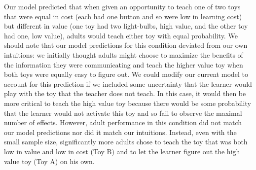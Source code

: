 \documentclass[10pt,letterpaper]{article}
\begin{document}
Our model predicted that when given an opportunity to teach one of two toys that were equal in cost (each had one button and so were low in learning cost) but different in value (one toy had two light-bulbs, high value, and the other toy had one, low value), adults would teach either toy with equal probability. We should note that our model predictions for this condition deviated from our own intuitions: we initially thought adults might choose to maximize the benefits of the information they were communicating and teach the higher value toy when both toys were equally easy to figure out. We could modify our current model to account for this prediction if we included some uncertainty that the learner would play with the toy that the teacher does not teach. In this case, it would then be more critical to teach the high value toy because there would be some probability that the learner would not activate this toy and so fail to observe the maximal number of effects. However, adult performance in this condition did not match our model predictions nor did it match our intuitions. Instead, even with the small sample size, significantly more adults chose to teach the toy that was both low in value and low in cost (Toy B) and to let the learner figure out the high value toy (Toy A) on his own. 
\end{document}
